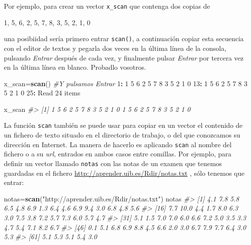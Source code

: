\documentclass[
]{book}
\newenvironment{Shaded}{\begin{snugshade}}{\end{snugshade}}
\newcommand{\CommentTok}[1]{\textcolor[rgb]{0.56,0.35,0.01}{\textit{#1}}}
\newcommand{\DecValTok}[1]{\textcolor[rgb]{0.00,0.00,0.81}{#1}}
\newcommand{\KeywordTok}[1]{\textcolor[rgb]{0.13,0.29,0.53}{\textbf{#1}}}
\newcommand{\NormalTok}[1]{#1}
\newcommand{\OperatorTok}[1]{\textcolor[rgb]{0.81,0.36,0.00}{\textbf{#1}}}
\newcommand{\StringTok}[1]{\textcolor[rgb]{0.31,0.60,0.02}{#1}}
\theoremstyle{definition}
\theoremstyle{definition}
\theoremstyle{definition}
\theoremstyle{remark}
\begin{document}
Por ejemplo, para crear un vector \texttt{x\_scan} que contenga dos copias de

1, 5, 6, 2, 5, 7, 8, 3, 5, 2, 1, 0

una posibiidad sería primero entrar \texttt{scan()}, a continuación copiar esta secuencia con el editor de textos y pegarla dos veces en la última línea de la consola, pulsando \emph{Entrar} después de cada vez, y finalmente pulsar \emph{Entrar} por tercera vez en la última línea en blanco. Probadlo vosotros.

\begin{Shaded}
\begin{Highlighting}[]
\NormalTok{x\_scan=}\KeywordTok{scan}\NormalTok{()  }\CommentTok{\#Y pulsamos Entrar}
\DecValTok{1}\OperatorTok{:}\StringTok{ }\DecValTok{1} \DecValTok{5} \DecValTok{6} \DecValTok{2} \DecValTok{5} \DecValTok{7} \DecValTok{8} \DecValTok{3} \DecValTok{5} \DecValTok{2} \DecValTok{1} \DecValTok{0}
\DecValTok{13}\OperatorTok{:}\StringTok{ }\DecValTok{1} \DecValTok{5} \DecValTok{6} \DecValTok{2} \DecValTok{5} \DecValTok{7} \DecValTok{8} \DecValTok{3} \DecValTok{5} \DecValTok{2} \DecValTok{1} \DecValTok{0}
\DecValTok{25}\OperatorTok{:}\StringTok{ }
\NormalTok{Read }\DecValTok{24}\NormalTok{ items}
\end{Highlighting}
\end{Shaded}

\begin{Shaded}
\begin{Highlighting}[]
\NormalTok{x\_scan}
\CommentTok{\#\textgreater{}  [1] 1 5 6 2 5 7 8 3 5 2 1 0 1 5 6 2 5 7 8 3 5 2 1 0}
\end{Highlighting}
\end{Shaded}

La función \texttt{scan} también se puede usar para copiar en un vector el contenido de un fichero de texto situado en el directorio de trabajo, o del que conozcamos su dirección en Internet. La manera de hacerlo es aplicando \texttt{scan}
al nombre del fichero o a su \emph{url}, entrados en ambos casos entre comillas. Por ejemplo, para definir un vector llamado \texttt{notas} con las notas de un examen que tenemos guardadas en el fichero
\url{http://aprender.uib.es/Rdir/notas.txt} , sólo tenemos que entrar:

\begin{Shaded}
\begin{Highlighting}[]
\NormalTok{notas=}\KeywordTok{scan}\NormalTok{(}\StringTok{"http://aprender.uib.es/Rdir/notas.txt"}\NormalTok{)}
\NormalTok{notas}
\CommentTok{\#\textgreater{}  [1]  4.1  7.8  5.8  6.5  4.8  6.9  1.3  6.4  4.6  6.9  9.4  3.0  6.8  4.8  5.6}
\CommentTok{\#\textgreater{} [16]  7.7 10.0  4.4  1.7  8.0  6.3  3.0  7.5  3.8  7.2  5.7  7.3  6.0  5.7  4.7}
\CommentTok{\#\textgreater{} [31]  5.1  1.5  7.0  7.0  6.0  6.6  7.2  5.0  3.5  3.3  4.7  5.4  7.1  8.2  6.7}
\CommentTok{\#\textgreater{} [46]  0.1  5.1  6.8  6.9  8.8  4.5  6.6  2.0  3.0  6.7  7.9  7.7  6.4  3.0  5.3}
\CommentTok{\#\textgreater{} [61]  5.1  5.3  5.1  5.4  3.0}
\end{Highlighting}
\end{Shaded}
\end{document}
